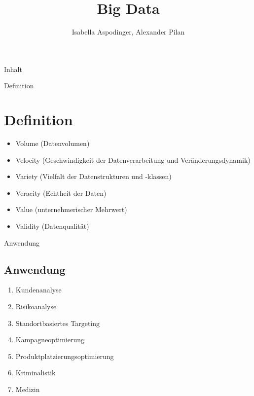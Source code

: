 \documentclass[11pt]{beamer}
\author{Isabella Aspodinger, Alexander Pilan}
\title{Big Data}
\begin{document}
\begin{frame}
\titlepage
\end{frame}

\begin{frame}{Inhalt}
\tableofcontents
\end{frame}


\begin{frame}{Definition}
\section{Definition}
\begin{itemize}
\item Volume (Datenvolumen)
\item Velocity (Geschwindigkeit der Datenverarbeitung und Veränderungsdynamik)
\item Variety (Vielfalt der Datenstrukturen und -klassen)
\item Veracity (Echtheit der Daten)
\item Value (unternehmerischer Mehrwert)
\item Validity (Datenqualität)
\end{itemize}
\end{frame}


\begin{frame}{Anwendung}
\subsection{Anwendung}
	\begin{enumerate}
		\item Kundenanalyse
		\item Risikoanalyse
		\item Standortbasiertes Targeting
		\item Kampagneoptimierung
		\item Produktplatzierungsoptimierung
		\item Kriminalistik
		\item Medizin
	\end{enumerate}

\end{frame}
\end{document}
